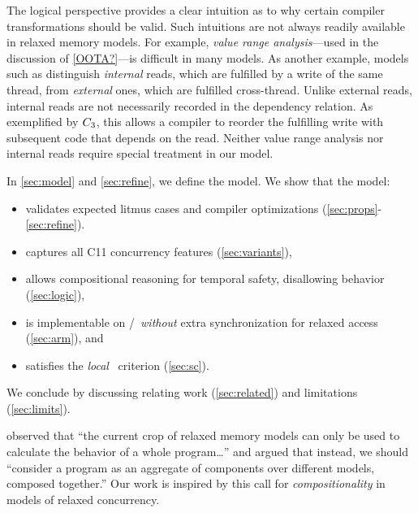 The logical perspective provides a clear intuition as to why certain compiler
transformations should be valid.  Such intuitions are not always readily
available in relaxed memory models.  For example, \emph{value range
  analysis}---used in the discussion of \eqref{OOTA?}---is difficult in many
models.  As another example, models such as \armeight{} distinguish
\emph{internal} reads, which are fulfilled by a write of the same thread,
from \emph{external} ones, which are fulfilled cross-thread.  Unlike
external reads, internal reads are not necessarily recorded in
the dependency relation.  As exemplified by $C_3$, this allows a compiler
to reorder the fulfilling write with subsequent code that depends on the
read.  Neither value range analysis nor internal reads require special
treatment in our model.

In \textsection\ref{sec:model} and \textsection\ref{sec:refine}, we define the model.  We show that the model:
\begin{itemize}
\item validates expected litmus cases and compiler optimizations
  (\textsection\ref{sec:props}-\ref{sec:refine}).

\item captures all C11 concurrency features  %
  (\textsection\ref{sec:variants}),

\item allows compositional reasoning for temporal safety, disallowing \oota{} behavior %
  (\textsection\ref{sec:logic}),

\item is implementable on \armeight/\tso\ {\em without} extra synchronization for
  relaxed access (\textsection\ref{sec:arm}), and

\item  satisfies the \emph{local} \drfsc\ criterion \cite{Dolan:2018:BDR:3192366.3192421} (\textsection\ref{sec:sc}).

\end{itemize}
We conclude by discussing relating work (\textsection\ref{sec:related}) and limitations (\textsection\ref{sec:limits}).

\citet{Batty17} observed that ``the current crop of relaxed memory models can
only be used to calculate the behavior of a whole program\ldots'' and argued
that instead, we should ``consider a program as an aggregate of components
over different models, composed together.''  Our work is inspired by this
call for \emph{compositionality} in models of relaxed concurrency.

